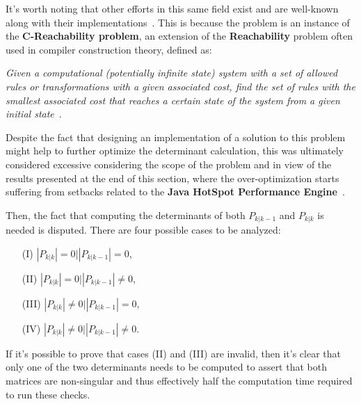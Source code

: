 It's worth noting that other efforts in this same field exist and are well-known~\cite{pelegri1988optimal,aho1989code} along with their implementations~\cite{fraser1991burg}.
This is because the problem is an instance of the \textbf{C-Reachability problem}, an extension of the \textbf{Reachability} problem often used in compiler construction theory, defined as:

\textit{Given a computational (potentially infinite state) system with a set of allowed rules or transformations with a given associated cost, find the set of rules with the smallest associated cost that reaches a certain state of the system from a given initial state}~\cite{pelegri1988optimal}.

Despite the fact that designing an implementation of a solution to this problem might help to further optimize the determinant calculation, this was ultimately considered excessive considering the scope of the problem and in view of the results presented at the end of this section, where the over-optimization starts suffering from setbacks related to the \textbf{Java HotSpot Performance Engine}~\cite{meloan1999java}.

Then, the fact that computing the determinants of both $P_{k|k-1}$ and $P_{k|k}$ is needed is disputed.
There are four possible cases to be analyzed:
    \begin{itemize}
        \item [(I)] $|P_{k|k}|=0\bigr||P_{k|k-1}|=0$,
        \item [(II)] $|P_{k|k}|=0\bigr||P_{k|k-1}|\neq0$,
        \item [(III)] $|P_{k|k}|\neq0\bigr||P_{k|k-1}|=0$,
        \item [(IV)] $|P_{k|k}|\neq0\bigr||P_{k|k-1}|\neq0$.
    \end{itemize}
If it's possible to prove that cases (II) and (III) are invalid, then it's clear that only one of the two determinants needs to be computed to assert that both matrices are non-singular and thus effectively half the computation time required to run these checks.


